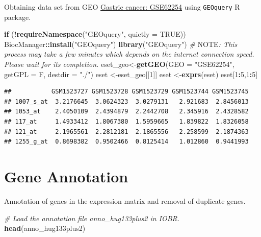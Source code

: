 \documentclass[
  12pt,
]{book}
\newenvironment{Shaded}{\begin{snugshade}}{\end{snugshade}}
\newcommand{\AlertTok}[1]{\textcolor[rgb]{0.94,0.16,0.16}{#1}}
\newcommand{\AttributeTok}[1]{\textcolor[rgb]{0.13,0.29,0.53}{#1}}
\newcommand{\CommentTok}[1]{\textcolor[rgb]{0.56,0.35,0.01}{\textit{#1}}}
\newcommand{\ConstantTok}[1]{\textcolor[rgb]{0.56,0.35,0.01}{#1}}
\newcommand{\ControlFlowTok}[1]{\textcolor[rgb]{0.13,0.29,0.53}{\textbf{#1}}}
\newcommand{\DecValTok}[1]{\textcolor[rgb]{0.00,0.00,0.81}{#1}}
\newcommand{\FunctionTok}[1]{\textcolor[rgb]{0.13,0.29,0.53}{\textbf{#1}}}
\newcommand{\NormalTok}[1]{#1}
\newcommand{\OtherTok}[1]{\textcolor[rgb]{0.56,0.35,0.01}{#1}}
\newcommand{\SpecialCharTok}[1]{\textcolor[rgb]{0.81,0.36,0.00}{\textbf{#1}}}
\newcommand{\StringTok}[1]{\textcolor[rgb]{0.31,0.60,0.02}{#1}}
\theoremstyle{definition}
\theoremstyle{definition}
\theoremstyle{definition}
\theoremstyle{definition}
\theoremstyle{remark}
\begin{document}
Obtaining data set from GEO \href{https://pubmed.ncbi.nlm.nih.gov/25894828/}{Gastric cancer: GSE62254} using \texttt{GEOquery} R package.

\begin{Shaded}
\begin{Highlighting}[]
\ControlFlowTok{if}\NormalTok{ (}\SpecialCharTok{!}\FunctionTok{requireNamespace}\NormalTok{(}\StringTok{"GEOquery"}\NormalTok{, }\AttributeTok{quietly =} \ConstantTok{TRUE}\NormalTok{))  BiocManager}\SpecialCharTok{::}\FunctionTok{install}\NormalTok{(}\StringTok{"GEOquery"}\NormalTok{)}
\FunctionTok{library}\NormalTok{(}\StringTok{"GEOquery"}\NormalTok{)}
\CommentTok{\# }\AlertTok{NOTE}\CommentTok{: This process may take a few minutes which depends on the internet connection speed. Please wait for its completion.}
\NormalTok{eset\_geo}\OtherTok{\textless{}{-}}\FunctionTok{getGEO}\NormalTok{(}\AttributeTok{GEO     =} \StringTok{"GSE62254"}\NormalTok{, }\AttributeTok{getGPL  =}\NormalTok{ F, }\AttributeTok{destdir =} \StringTok{"./"}\NormalTok{)}
\NormalTok{eset    }\OtherTok{\textless{}{-}}\NormalTok{eset\_geo[[}\DecValTok{1}\NormalTok{]]}
\NormalTok{eset    }\OtherTok{\textless{}{-}}\FunctionTok{exprs}\NormalTok{(eset)}
\NormalTok{eset[}\DecValTok{1}\SpecialCharTok{:}\DecValTok{5}\NormalTok{,}\DecValTok{1}\SpecialCharTok{:}\DecValTok{5}\NormalTok{]}
\end{Highlighting}
\end{Shaded}

\begin{verbatim}
##           GSM1523727 GSM1523728 GSM1523729 GSM1523744 GSM1523745
## 1007_s_at  3.2176645  3.0624323  3.0279131   2.921683  2.8456013
## 1053_at    2.4050109  2.4394879  2.2442708   2.345916  2.4328582
## 117_at     1.4933412  1.8067380  1.5959665   1.839822  1.8326058
## 121_at     2.1965561  2.2812181  2.1865556   2.258599  2.1874363
## 1255_g_at  0.8698382  0.9502466  0.8125414   1.012860  0.9441993
\end{verbatim}

\hypertarget{gene-annotation}{%
\section{Gene Annotation}\label{gene-annotation}}

Annotation of genes in the expression matrix and removal of duplicate genes.

\begin{Shaded}
\begin{Highlighting}[]
\CommentTok{\# Load the annotation file \textasciigrave{}anno\_hug133plus2\textasciigrave{} in IOBR.}
\FunctionTok{head}\NormalTok{(anno\_hug133plus2)}
\end{Highlighting}
\end{Shaded}
\end{document}
